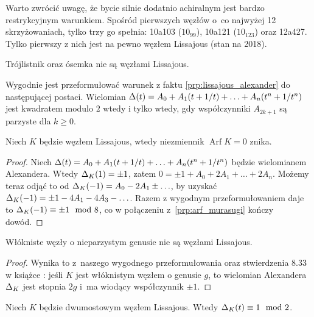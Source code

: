 Warto zwrócić uwagę, że bycie silnie dodatnio achiralnym jest bardzo restrykcyjnym warunkiem.
Spośród pierwszych węzłów o~co najwyżej 12 skrzyżowaniach, tylko trzy go spełnia: 10a103 ($10_{99}$), 10a121 ($10_{123}$) oraz 12a427.
Tylko pierwszy z nich jest na pewno węzłem Lissajous (stan na 2018).

\begin{example}
    Trójlistnik oraz ósemka nie są węzłami Lissajous.
\end{example}

Wygodnie jest przeformułować warunek z faktu \ref{prp:lissajous_alexander} do następującej postaci.
Wielomian $\Delta(t) = A_0 + A_1(t+1/t) + \ldots + A_n(t^n + 1/t^n)$ jest kwadratem modulo $2$ wtedy i tylko wtedy, gdy współczynniki $A_{2k+1}$ są parzyste dla $k \ge 0$.

\begin{corollary}
%
    Niech $K$ będzie węzłem Lissajous, wtedy niezmiennik $\operatorname{Arf} K = 0$ znika.
\end{corollary}

\begin{proof}
    Niech $\Delta(t) = A_0 + A_1(t+1/t) + \ldots + A_n(t^n + 1/t^n)$ będzie  wielomianem Alexandera.
    Wtedy $\Delta_K(1) = \pm 1$, zatem $0 = \pm 1 + A_0 + 2A_1 + \ldots + 2A_n$.
    Możemy teraz odjąć to od $\Delta_K(-1) = A_0 - 2A_1 \pm \ldots$, by uzyskać $\Delta_K(-1) = \pm 1 - 4A_1 - 4A_3 - \ldots$.
    Razem z wygodnym przeformułowaniem daje to $\Delta_K(-1) \equiv \pm 1 \mod 8$, co w połączeniu z~\ref{prp:arf_murasugi} kończy dowód.
\end{proof}

\begin{corollary}
%
\label{cor:lissajous_fibered}%
    Włókniste węzły o nieparzystym genusie nie są węzłami Lissajous.
\end{corollary}

\begin{proof}
    Wynika to z~naszego wygodnego przeformułowania oraz stwierdzenia 8.33 w książce \cite{burde14}: jeśli $K$ jest włóknistym węzłem o genusie $g$, to wielomian Alexandera $\Delta_K$ jest stopnia $2g$ i~ma wiodący współczynnik $\pm 1$.
\end{proof}

\begin{corollary}
%
\label{cor:lissajous_twobridge}%
    Niech $K$ będzie dwumostowym węzłem Lissajous.
    Wtedy $\Delta_K(t) \equiv 1 \mod 2$.
\end{corollary}

